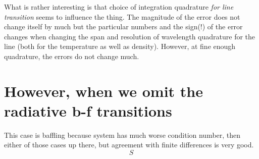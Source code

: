 \documentclass[a4paper,10pt]{article}
\begin{document}
What is rather interesting is that choice of integration quadrature \emph{for line transition} seems to influence the thing. The magnitude of the error does not change itself by much but the particular numbers and the sign(!) of the error changes when changing the span and resolution of wavelength quadrature for the line (both for the temperature as well as density). However, at fine enough quadrature, the errors do not change much. 


\section{However, when we omit the radiative b-f transitions}

This case is baffling because system has much worse condition number, then either of those cases up there, but agreement with finite differences is very good. 
\begin{equation}
S
\end{equation}
\end{document}
